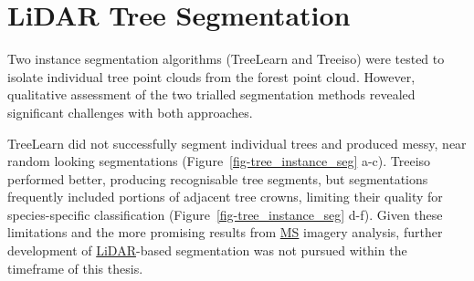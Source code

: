\documentclass[
]{scrreprt}
\begin{document}
\section{LiDAR Tree Segmentation}\label{lidar-tree-segmentation}

Two instance segmentation algorithms (TreeLearn and Treeiso) were tested
to isolate individual tree point clouds from the forest point cloud.
However, qualitative assessment of the two trialled segmentation methods
revealed significant challenges with both approaches.

TreeLearn did not successfully segment individual trees and produced
messy, near random looking segmentations
(Figure~\ref{fig-tree_instance_seg} a-c). Treeiso performed better,
producing recognisable tree segments, but segmentations frequently
included portions of adjacent tree crowns, limiting their quality for
species-specific classification (Figure~\ref{fig-tree_instance_seg}
d-f). Given these limitations and the more promising results from
\hyperref[acronyms_MS]{MS} imagery analysis, further development of
\hyperref[acronyms_LiDAR]{LiDAR}-based segmentation was not pursued
within the timeframe of this thesis.
\end{document}
